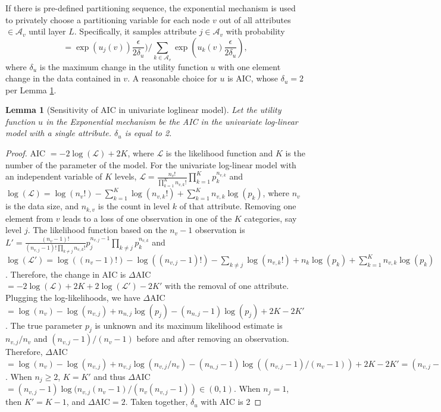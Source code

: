 \documentclass[12pt, A4]{article}
\theoremstyle{plain}
\theoremstyle{exampstyle}\newtheorem{defn}{Definition}
\theoremstyle{exampstyle}\newtheorem{lem}{Lemma}
\theoremstyle{exampstyle}\newtheorem{cor}{Corollary}
\theoremstyle{exampstyle}\newtheorem{pro}{Proposition}
\theoremstyle{exampstyle}\newtheorem{cla}{Claim}
\theoremstyle{exampstyle}\newtheorem{rem}{Remark}
\begin{document}
If there is pre-defined partitioning sequence, the exponential mechanism is used to privately choose a partitioning variable for each node $v$  out of all attributes $\in\mathcal{A}_v$ until layer $L$. Specifically, it samples attribute  $j\in\mathcal{A}_v$ with probability 
\begin{equation}\label{eqn:exp}
\textstyle = \exp(u_j(v)) \frac{\epsilon}{2\delta_u} )/\sum_{k\in\mathcal{A}_v} \exp\left(u_k(v) \frac{\epsilon}{2\delta_u}\right),    
\end{equation} 
where $\delta_u$ is the maximum change in the utility function $u$ with one element change in the data contained in $v$. A reasonable choice for $u$ is AIC, whose  $\delta_u=2$ per Lemma  \ref{lem:AIC}.
\begin{lem}[Sensitivity of AIC in univariate loglinear model]\label{lem:AIC} Let the utility function $u$ in the Exponential mechanism be the AIC in the univariate log-linear model with a single attribute. $\delta_u$  is equal to 2. 
\end{lem}
\begin{proof}
AIC $=-2\log(\mathcal{L}) + 2K$, where $\mathcal{L}$ is the likelihood function and $K$ is the number of the parameter of the model. For the univariate log-linear model with an independent variable of $K$ levels, $\mathcal{L}=\frac{n_v!}{\prod_{k=1}^K n_{v,k}! } \prod_{k=1}^Kp_k^{n_{v,k}}$ and $\log(\mathcal{L})=\log(n_v!)-\sum_{k=1}^K \log(n_{v,k}!)+\sum_{k=1}^K n_{v,k}\log(p_k)$, where $n_v$ is the data size, and $n_{k,v}$ is the count in level $k$ of that attribute.  Removing one element from $v$ leads to a loss of one observation in one of the $K$ categories, say level $j$. The likelihood function based on the $n_v-1$ observation is 
$L'=\frac{(n_v-1)!}{(n_{v,j}-1)!\prod_{k\ne j} n_{v,k}!} p_j^{n_{v,j}-1} \prod_{k\ne j} p_k^{n_{v,k}} $ and  $\log(\mathcal{L}')=\log((n_v-1)!)-\log((n_{v,j}-1)!)-\sum_{k\ne j} \log(n_{v,k}!)+n_k\log(p_k)+\sum_{k=1}^K n_{v,k}\log(p_k)$.  Therefore, the change in AIC is $\Delta$AIC$=-2\log(\mathcal{L})+2K+2\log(\mathcal{L}')-2K'$ with the removal of one attribute. Plugging the log-likelihoods, we have $\Delta$AIC$=\log(n_v)-\log(n_{v,j})+n_{n,j}\log(p_j)-(n_{n,j}-1)\log(p_j) +2K-2K'$. The true parameter $p_j$ is unknown and its maximum likelihood estimate is $n_{v,j}/n_v$ and  $(n_{v,j}-1)/(n_v-1)$ before and after removing an observation. Therefore, $\Delta$AIC 
$=\log(n_v)-\log(n_{v,j})+n_{v,j}\log(n_{v,j}/n_v)-(n_{n,j}-1)\log((n_{v,j}-1)/(n_v-1)) +2K-2K'= (n_{v,j}-1)\log(n_{v,j}(n_v-1)/(n_v(n_{v,j}-1))+2K-2K'$. When $n_j\ge2$, $K=K'$ and thus $\Delta$AIC 
$=(n_{v,j}-1)\log(n_{v,j}(n_v-1)/(n_v(n_{v,j}-1)) \in(0,1)$. When $n_j=1$, then $K'=K-1$, and $\Delta$AIC$=2$. Taken together, $\delta_u$ with AIC is 2
\end{proof}
\end{document}

